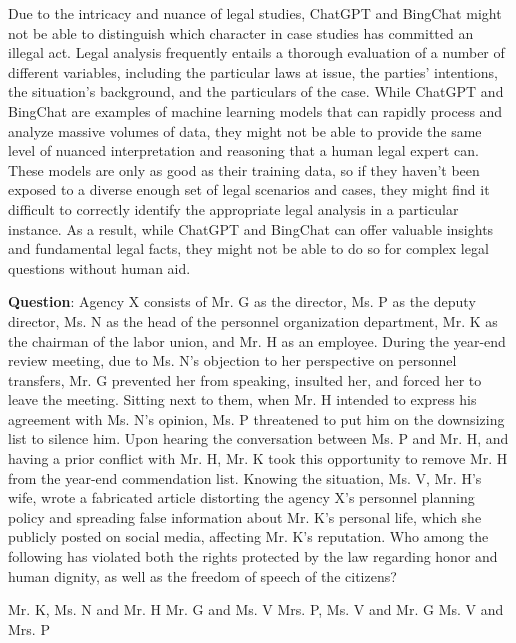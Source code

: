 \documentclass{article}
\begin{document}
{	Due to the intricacy and nuance of legal studies, ChatGPT and BingChat might not be able to distinguish which character in case studies has committed an illegal act. Legal analysis frequently entails a thorough evaluation of a number of different variables, including the particular laws at issue, the parties' intentions, the situation's background, and the particulars of the case. While ChatGPT and BingChat are examples of machine learning models that can rapidly process and analyze massive volumes of data, they might not be able to provide the same level of nuanced interpretation and reasoning that a human legal expert can.  These models are only as good as their training data, so if they haven't been exposed to a diverse enough set of legal scenarios and cases, they might find it difficult to correctly identify the appropriate legal analysis in a particular instance. As a result, while ChatGPT and BingChat can offer valuable insights and fundamental legal facts, they might not be able to do so for complex legal questions without human aid.
	
	
	
	\begin{mdframed}[linewidth=1pt,linecolor=red] \textbf{Question}: Agency X consists of Mr. G as the director, Ms. P as the deputy director, Ms. N as the head of the personnel organization department, Mr. K as the chairman of the labor union, and Mr. H as an employee. During the year-end review meeting, due to Ms. N's objection to her perspective on personnel transfers, Mr. G prevented her from speaking, insulted her, and forced her to leave the meeting. Sitting next to them, when Mr. H intended to express his agreement with Ms. N's opinion, Ms. P threatened to put him on the downsizing list to silence him. Upon hearing the conversation between Ms. P and Mr. H, and having a prior conflict with Mr. H, Mr. K took this opportunity to remove Mr. H from the year-end commendation list. Knowing the situation, Ms. V, Mr. H's wife, wrote a fabricated article distorting the agency X's personnel planning policy and spreading false information about Mr. K's personal life, which she publicly posted on social media, affecting Mr. K's reputation. Who among the following has violated both the rights protected by the law regarding honor and human dignity, as well as the freedom of speech of the citizens? 
		
		\begin{choices}
			\choice Mr. K, Ms. N and Mr. H
			\choice Mr. G and Ms. V
			\choice Mrs. P, Ms. V and Mr. G 
			\choice Ms. V and Mrs. P
		\end{choices}
		

\end{mdframed}}
\end{document}
